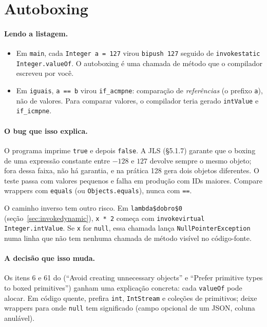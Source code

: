 \section{Autoboxing}
\label{sec:autoboxing}




\paragraph{Lendo a listagem.}
\begin{itemize}
\item Em \texttt{main}, cada \texttt{Integer a = 127} virou
  \texttt{bipush 127} seguido de \texttt{invokestatic Integer.valueOf}.
  O autoboxing é uma chamada de método que o compilador escreveu por
  você.
\item Em \texttt{iguais}, \texttt{a == b} virou \texttt{if\_acmpne}:
  comparação de \emph{referências} (o prefixo \texttt{a}), não de
  valores. Para comparar valores, o compilador teria gerado
  \texttt{intValue} e \texttt{if\_icmpne}.
\end{itemize}

\paragraph{O bug que isso explica.}
O programa imprime \texttt{true} e depois \texttt{false}. A JLS (§5.1.7)
garante que o boxing de uma expressão constante entre $-128$ e $127$
devolve sempre o mesmo objeto; fora dessa faixa, não há garantia, e na
prática 128 gera dois objetos diferentes. O teste passa com valores
pequenos e falha em produção com IDs maiores. Compare wrappers com
\texttt{equals} (ou \texttt{Objects.equals}), nunca com \texttt{==}.

O caminho inverso tem outro risco. Em \texttt{lambda\$dobro\$0}
(seção~\ref{sec:invokedynamic}), \texttt{x * 2} começa com
\texttt{invokevirtual Integer.intValue}. Se \texttt{x} for \texttt{null},
essa chamada lança \texttt{NullPointerException} numa linha que não tem
nenhuma chamada de método visível no código-fonte.

\paragraph{A decisão que isso muda.}
Os itens 6 e 61 do  (\enquote{Avoid creating
unnecessary objects} e \enquote{Prefer primitive types to boxed
primitives}) ganham uma explicação concreta: cada \texttt{valueOf} pode
alocar. Em código quente, prefira \texttt{int}, \texttt{IntStream} e
coleções de primitivos; deixe wrappers para onde \texttt{null} tem
significado (campo opcional de um JSON, coluna anulável).
